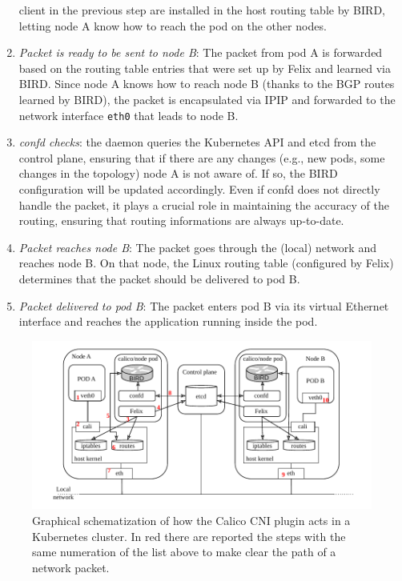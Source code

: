 \begin{enumerate}
    client in the previous step are installed in the host routing table by BIRD,
    letting node A know how to reach the pod on the other nodes.
  \item \textit{Packet is ready to be sent to node B}: The packet from pod A is
    forwarded based on the routing table entries that were set up by Felix and
    learned via BIRD. Since node A knows how to reach node B (thanks to the BGP
    routes learned by BIRD), the packet is encapsulated via IPIP and forwarded
    to the network interface \texttt{eth0} that leads to node B.
  \item \textit{confd checks}: the daemon queries the Kubernetes API and etcd
    from the control plane, ensuring that if there are any changes (e.g., new
    pods, some changes in the topology) node A is not aware of. If so, the BIRD
    configuration will be updated accordingly. Even if confd does not directly
    handle the packet, it plays a crucial role in maintaining the accuracy of
    the routing, ensuring that routing informations are always up-to-date.
  \item \textit{Packet reaches node B}: The packet goes through the (local)
    network and reaches node B. On that node, the Linux routing table
    (configured by Felix) determines that the packet should be delivered to pod
    B.
  \item \textit{Packet delivered to pod B}: The packet enters pod B via its
    virtual Ethernet interface and reaches the application running inside the
    pod.
\end{enumerate}

\begin{figure}
  \centering
  \includegraphics[width=\textwidth]{img/chpt2/CNI-calico}
  \caption{Graphical schematization of how the Calico CNI plugin acts in a
    Kubernetes cluster. In red there are reported the steps with the same
    numeration of the list above to make clear the path of a network packet.}
  \label{fig:cni-calico}
\end{figure}

